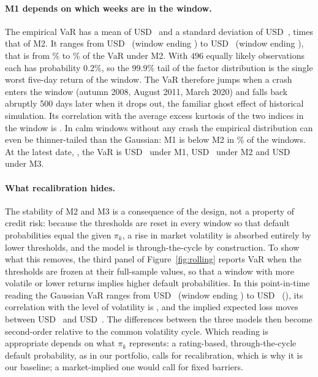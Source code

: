 \paragraph{M1 depends on which weeks are in the window.}
The empirical VaR has a mean of USD~ and a standard deviation of USD~,  times that of M2. It ranges from USD~ (window ending ) to USD~ (window ending ), that is from \% to \% of the VaR under M2. With $496$ equally likely observations each has probability $0.2\%$, so the $99.9\%$ tail of the factor distribution is the single worst five-day return of the window. The VaR therefore jumps when a crash enters the window (autumn 2008, August 2011, March 2020) and falls back abruptly 500 days later when it drops out, the familiar ghost effect of historical simulation. Its correlation with the average excess kurtosis of the two indices in the window is . In calm windows without any crash the empirical distribution can even be thinner-tailed than the Gaussian: M1 is below M2 in \% of the windows. At the latest date, , the VaR is USD~ under M1, USD~ under M2 and USD~ under M3.

\paragraph{What recalibration hides.}
The stability of M2 and M3 is a consequence of the design, not a property of credit risk: because the thresholds are reset in every window so that default probabilities equal the given $\pi_k$, a rise in market volatility is absorbed entirely by lower thresholds, and the model is through-the-cycle by construction. To show what this removes, the third panel of Figure~\ref{fig:rolling} reports VaR when the thresholds are frozen at their full-sample values, so that a window with more volatile or lower returns implies higher default probabilities. In this point-in-time reading the Gaussian VaR ranges from USD~ (window ending ) to USD~ (), its correlation with the level of volatility is , and the implied expected loss moves between USD~ and USD~. The differences between the three models then become second-order relative to the common volatility cycle. Which reading is appropriate depends on what $\pi_k$ represents: a rating-based, through-the-cycle default probability, as in our portfolio, calls for recalibration, which is why it is our baseline; a market-implied one would call for fixed barriers.
